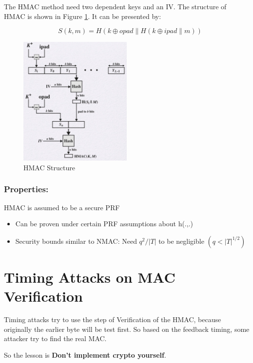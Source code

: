 The HMAC method need two dependent keys and an IV. The structure of HMAC is shown in Figure \ref{fig: Lecture 4: HMAC Structure}. It can be presented by:


$$
\quad S(k, m)=H(k \oplus o p a d \| H(k \oplus i p a d \| m))
$$

\begin{figure}[h]
    \centering
    \includegraphics[width=0.5\textwidth]{Stanford_Crypto_1/fig/04_Integrity/HMAC Structure.png}
    \caption{HMAC Structure}
    \label{fig: Lecture 4: HMAC Structure}
\end{figure}

\subsubsection{Properties:}

HMAC is assumed to be a secure PRF
\begin{itemize} [itemsep=2pt,topsep=0pt,parsep=0pt]
    \item Can be proven under certain PRF assumptions about h(.,.)
    \item Security bounds similar to NMAC: Need $q^{2} /|T|$ to be negligible $\left(q<|T|^{1 / 2}\right)$
\end{itemize}

\section{Timing Attacks on MAC Verification}

Timing attacks try to use the step of Verification of the HMAC, because originally the earlier byte will be test first. So based on the feedback timing, some attacker try to find the real MAC.

So the lesson is \textbf{Don't implement crypto yourself}.



